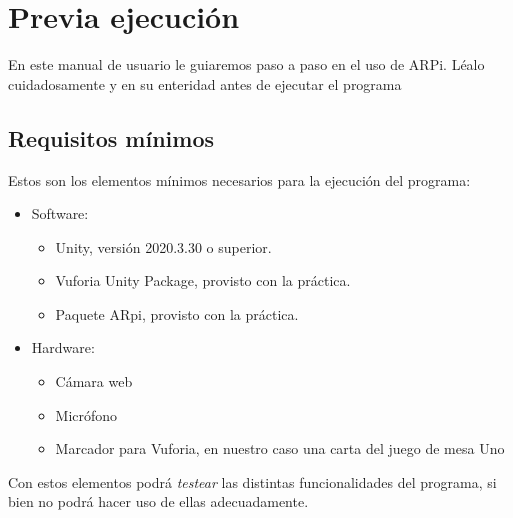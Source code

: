 \chapter{Previa ejecución}
En este manual de usuario le guiaremos paso a paso en el uso de ARPi. Léalo cuidadosamente y en su enteridad antes de 
ejecutar el programa 

\section{Requisitos mínimos}
Estos son los elementos mínimos necesarios para la ejecución del programa:
\begin{itemize}
	\item Software: 
	\begin{itemize}
		\item Unity, versión 2020.3.30 o superior.
		\item Vuforia Unity Package, provisto con la práctica.
		\item Paquete ARpi, provisto con la práctica.
	\end{itemize}
	\item Hardware:
	\begin{itemize}
		\item Cámara web
		\item Micrófono
		\item Marcador para Vuforia, en nuestro caso una carta del juego de mesa Uno
	\end{itemize}
\end{itemize}

Con estos elementos podrá \textit{testear} las distintas funcionalidades del programa, si bien no podrá 
hacer uso de ellas adecuadamente.


